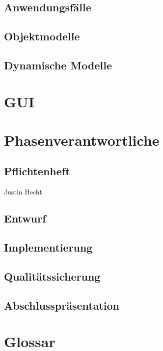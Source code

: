 \documentclass[a4paper]{scrreprt}
\begin{document}
\section{Anwendungsfälle}
\section{Objektmodelle}
\section{Dynamische Modelle}


\chapter{GUI}


\chapter{Phasenverantwortliche}
\section{Pflichtenheft} Justin Hecht
\section{Entwurf} 
\section{Implementierung}
\section{Qualitätssicherung} 
\section{Abschlusspräsentation} 


\chapter{Glossar}
 

 

\listoffigures
 
\end{document}
